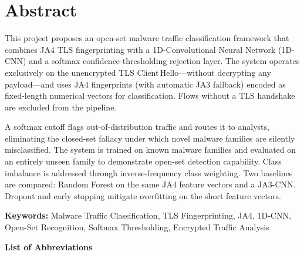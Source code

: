 \documentclass[12pt,a4paper]{report}
\begin{document}
\newpage
\chapter*{Abstract}

This project proposes an open-set malware traffic classification framework that
combines JA4 TLS fingerprinting with a 1D-Convolutional Neural Network (1D-CNN)
and a softmax confidence-thresholding rejection layer. The system operates
exclusively on the unencrypted TLS Client\,Hello---without decrypting any
payload---and uses JA4 fingerprints (with automatic JA3 fallback) encoded as
fixed-length numerical vectors for classification. Flows without a TLS handshake
are excluded from the pipeline.

A softmax cutoff flags out-of-distribution traffic and routes it to analysts,
eliminating the closed-set fallacy under which novel malware families are silently
misclassified. The system is trained on known malware families and evaluated on
an entirely unseen family to demonstrate open-set detection capability. Class
imbalance is addressed through inverse-frequency class weighting. Two baselines
are compared: Random Forest on the same JA4 feature vectors and a JA3-CNN.
Dropout and early stopping mitigate overfitting on the short feature vectors.

\vspace{0.1cm}
\noindent\textbf{Keywords:} Malware Traffic Classification, TLS Fingerprinting,
JA4, 1D-CNN, Open-Set Recognition, Softmax Thresholding, Encrypted
Traffic Analysis

\newpage
\tableofcontents
\listoftables
\listoffigures

\vspace{0.4cm}
\newpage
{\large\bfseries List of Abbreviations}
\end{document}
